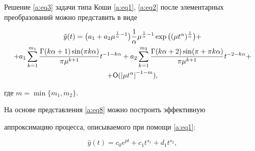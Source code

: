 Решение \eqref{a:eq3} задачи типа Коши \eqref{a:eq1}, \eqref{a:eq2} после элементарных преобразований можно представить в виде


\begin{multline}\label{a:eq8}

\tilde{y}(t)=\big(a_1+a_2 \mu ^{\frac{1}{\alpha}-1}\big)\frac{1}{\alpha}\mu^{\frac{1}{\alpha}-1}\exp \big((\mu t^{\alpha})^{\frac{1}{\alpha}}\big)+\\

+a_1 \sum \limits_{k=1}^{m_1} \dfrac{\Gamma(k\alpha+1) \sin(\pi k

\alpha)}{\pi \mu^{k+1}} t^{-1-k \alpha}+a_2 \sum

\limits_{k=1}^{m_2} \dfrac{\Gamma(k\alpha+2)\sin(\pi+\pi k

\alpha)}{\pi \mu^{k+1}} t^{-2-k \alpha}+\\

+{\sf O}({|\mu t^{\alpha}|}^{-1-m}),

\end{multline}

где $m=\min\{m_1, m_2\}$.







На основе представления \eqref{a:eq8} можно построить эффективную

аппроксимацию процесса, описываемого при помощи \eqref{a:eq1}:


\begin{equation}\label{a:eq9}

\hat{y}(t)=c_0 e^{p t}+ c_1 t^{s_1}+ d_1 t^{s_2},

\end{equation}

